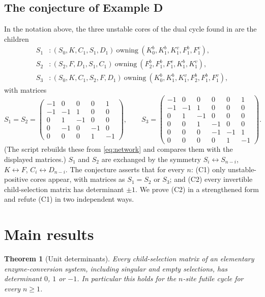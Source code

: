 \documentclass[11pt,a4paper]{article}
\theoremstyle{plain}
\newtheorem{theorem}{Theorem}[section]
\theoremstyle{definition}
\theoremstyle{remark}
\begin{document}
\subsection{The conjecture of Example D}\label{sec:conjecture}
In the notation above, the three unstable cores of the dual cycle found in \citep{VassenaStadler2024} are the children
\begin{equation}\label{eq:VScores}
\begin{aligned}
S_1&: (S_0,K,C_1,S_1,D_1)\ \text{owning}\ (K_0^b,K_1^b,K_1^v,F_1^b,F_1^v),\\
S_2&: (S_2,F,D_1,S_1,C_1)\ \text{owning}\ (F_2^b,F_1^b,F_1^v,K_1^b,K_1^v),\\
S_3&: (S_0,K,C_1,S_2,F,D_1)\ \text{owning}\ (K_0^b,K_1^b,K_1^v,F_2^b,F_1^b,F_1^v),
\end{aligned}
\end{equation}
with matrices
\[
S_1=S_2=\begin{pmatrix}-1&0&0&0&1\\-1&-1&1&0&0\\0&1&-1&0&0\\0&-1&0&-1&0\\0&0&0&1&-1\end{pmatrix},\qquad
S_3=\begin{pmatrix}-1&0&0&0&0&1\\-1&-1&1&0&0&0\\0&1&-1&0&0&0\\0&0&1&-1&0&0\\0&0&0&-1&-1&1\\0&0&0&0&1&-1\end{pmatrix}.
\]
(The script  rebuilds these from \eqref{eq:network} and compares them with the displayed matrices.) $S_1$ and $S_2$ are exchanged by the symmetry $S_i\leftrightarrow S_{n-i}$, $K\leftrightarrow F$, $C_i\leftrightarrow D_{n-i}$. The conjecture asserts that for every $n$: (C1) only unstable-positive cores appear, with matrices as $S_1=S_2$ or $S_3$; and (C2) every invertible child-selection matrix has determinant $\pm1$. We prove (C2) in a strengthened form and refute (C1) in two independent ways.

\section{Main results}\label{sec:results}

\begin{theorem}[Unit determinants]\label{thm:det}
Every child-selection matrix of an elementary enzyme-conversion system, including singular and empty selections, has determinant $0$, $1$ or $-1$. In particular this holds for the $n$-site futile cycle for every $n\ge1$.
\end{theorem}
\end{document}
